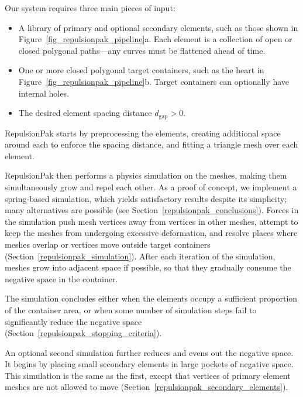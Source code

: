 Our system requires three main pieces of input:
\begin{itemize}
	\item A library of primary and optional secondary elements, such
		as those shown in Figure~\ref{fig_repulsionpak_pipeline}a.
	      Each element is a collection of 
		  open or closed polygonal paths---any curves must
		  be flattened ahead of time.
	\item One or more closed polygonal target containers, such as the
		heart in Figure~\ref{fig_repulsionpak_pipeline}b.  Target containers can optionally
		have internal holes.
	\item The desired element spacing distance $d_\mathrm{gap}>0$.
\end{itemize}

RepulsionPak starts by preprocessing the elements, creating additional space around
each to enforce the spacing distance, and fitting a triangle mesh over each element.


RepulsionPak then performs a physics simulation on the meshes, 
making them simultaneously grow and repel each other. As a
proof of concept, we implement a spring-based 
simulation, which yields satisfactory results despite its simplicity;
many alternatives are possible 
(see Section~\ref{repulsionpak_conclusions}).
Forces in the simulation push mesh vertices away from vertices in other meshes,
attempt to keep the meshes from undergoing excessive deformation, and resolve
places where meshes overlap or vertices move outside target containers
(Section~\ref{repulsionpak_simulation}).
After each iteration of the simulation, meshes grow into adjacent space
if possible, so that they gradually consume the negative space in the container.

The simulation concludes 
either when the elements occupy a sufficient proportion of the container area, or 
when some number of simulation steps fail to
significantly reduce the negative space
(Section~\ref{repulsionpak_stopping_criteria}).

An optional second simulation further reduces and evens out the
negative space.  It begins by placing small secondary elements in large
pockets of negative space.  This simulation is the same as the
first, except that vertices of primary element meshes are not allowed to move
(Section~\ref{repulsionpak_secondary_elements}).

